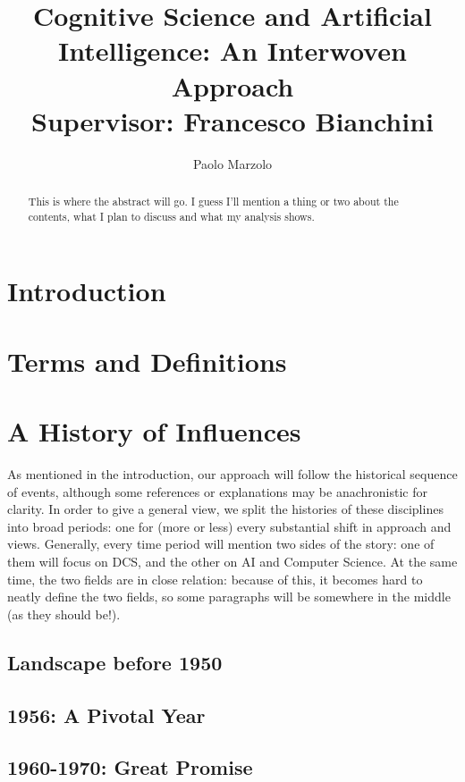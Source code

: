 \documentclass{article}
\title{Cognitive Science and Artificial Intelligence: An Interwoven Approach \\
\large Supervisor: Francesco Bianchini}
\author{Paolo Marzolo}
\begin{document}
\begin{abstract}
    This is where the abstract will go. I guess I'll mention a thing or two about the contents, what I plan to discuss and what my analysis shows.
\end{abstract}

\maketitle
\newpage

\section{Introduction}


\section{Terms and Definitions}


\section{A History of Influences}
As mentioned in the introduction, our approach will follow the historical sequence of events, although some references or explanations may be anachronistic for clarity. In order to give a general view, we split the histories of these disciplines into broad periods: one for (more or less) every substantial shift in approach and views. Generally, every time period will mention two sides of the story: one of them will focus on DCS, and the other on AI and Computer Science. At the same time, the two fields are in close relation: because of this, it becomes hard to neatly define the two fields, so some paragraphs will be somewhere in the middle (as they should be!).

\subsection{Landscape before 1950}


\subsection{1956: A Pivotal Year}


\subsection{1960-1970: Great Promise}

\end{document}
